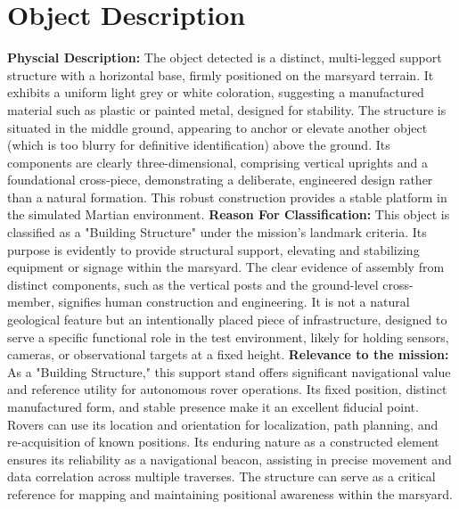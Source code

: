 \documentclass[a4paper,12pt]{report}
\begin{document}
    \section*{Object Description}
    \textbf{Physcial Description:} The object detected is a distinct, multi-legged support structure with a horizontal base, firmly positioned on the marsyard terrain. It exhibits a uniform light grey or white coloration, suggesting a manufactured material such as plastic or painted metal, designed for stability. The structure is situated in the middle ground, appearing to anchor or elevate another object (which is too blurry for definitive identification) above the ground. Its components are clearly three-dimensional, comprising vertical uprights and a foundational cross-piece, demonstrating a deliberate, engineered design rather than a natural formation. This robust construction provides a stable platform in the simulated Martian environment. \newline\newline
    \textbf{Reason For Classification:} This object is classified as a "Building Structure" under the mission's landmark criteria. Its purpose is evidently to provide structural support, elevating and stabilizing equipment or signage within the marsyard. The clear evidence of assembly from distinct components, such as the vertical posts and the ground-level cross-member, signifies human construction and engineering. It is not a natural geological feature but an intentionally placed piece of infrastructure, designed to serve a specific functional role in the test environment, likely for holding sensors, cameras, or observational targets at a fixed height. \newline\newline
    \textbf{Relevance to the mission:} As a "Building Structure," this support stand offers significant navigational value and reference utility for autonomous rover operations. Its fixed position, distinct manufactured form, and stable presence make it an excellent fiducial point. Rovers can use its location and orientation for localization, path planning, and re-acquisition of known positions. Its enduring nature as a constructed element ensures its reliability as a navigational beacon, assisting in precise movement and data correlation across multiple traverses. The structure can serve as a critical reference for mapping and maintaining positional awareness within the marsyard. 
    
    \clearpage
    
\end{document}
